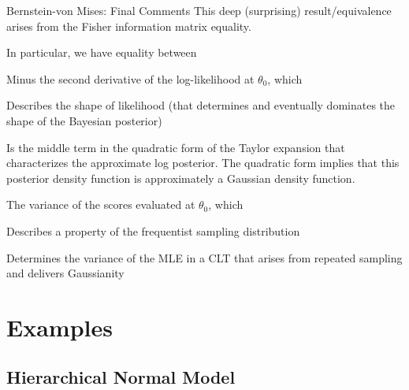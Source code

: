 \documentclass[aspectratio=169, handout]{beamer}
\begin{document}
{\footnotesize
\begin{frame}{Bernstein-von Mises: Final Comments}
This deep (surprising) result/equivalence arises from the Fisher
information matrix equality.

In particular, we have equality between
\begin{itemize}
    {\footnotesize
    \item Minus the second derivative of the log-likelihood at
      $\theta_0$, which
      \begin{itemize}
        {\scriptsize
        \item
          Describes the \alert{shape} of likelihood (that determines
          and eventually dominates the shape of the Bayesian posterior)
        \item Is the middle term in the \alert{quadratic form} of the
          \alert{Taylor expansion} that characterizes the approximate log
          posterior.
          The quadratic form implies that this posterior density function
          is approximately a \alert{Gaussian} density function.
        }
      \end{itemize}
    \item The variance of the scores evaluated at $\theta_0$, which
      \begin{itemize}
        {\scriptsize
        \item Describes a property of the frequentist
          \alert{sampling distribution}
        \item Determines the variance of the MLE in a \alert{CLT} that
          arises from repeated sampling and delivers \alert{Gaussianity}
        }
      \end{itemize}
    }
\end{itemize}
\end{frame}
}




\section{Examples}



\subsection{Hierarchical Normal Model}
\end{document}

